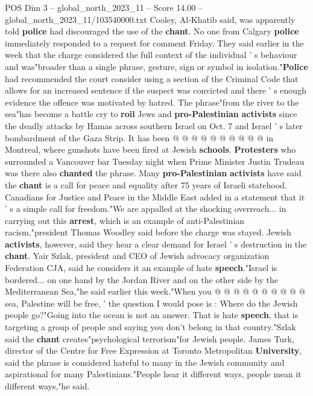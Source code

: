 \begin{textsample}{POS Dim 3 – global\_north\_2023\_11 – Score 14.00 – global\_north\_2023\_11/103540000.txt}
Cooley, Al-Khatib said, was apparently told \textbf{police} had discouraged the use of the \textbf{chant}.
No one from Calgary \textbf{police} immediately responded to a request for comment Friday.
They said earlier in the week that the charge considered the full context of the individual ' s behaviour and was"broader than a single phrase, gesture, sign or symbol in isolation."\textbf{Police} had recommended the court consider using a section of the Criminal Code that allows for an increased sentence if the suspect was convicted and there ' s enough evidence the offence was motivated by hatred.
The phrase"from the river to the sea"has become a battle cry to \textbf{roil} Jews and \textbf{pro-Palestinian} \textbf{activists} since the deadly attacks by Hamas across southern Israel on Oct. 7 and Israel ' s later bombardment of the Gaza Strip.
It has been @ @ @ @ @ @ @ @ @ @ in Montreal, where gunshots have been fired at Jewish \textbf{schools}. \textbf{Protesters} who surrounded a Vancouver bar Tuesday night when Prime Minister Justin Trudeau was there also \textbf{chanted} the phrase.
Many \textbf{pro-Palestinian} \textbf{activists} have said the \textbf{chant} is a call for peace and equality after 75 years of Israeli statehood.
Canadians for Justice and Peace in the Middle East added in a statement that it ' s a simple call for freedom."We are appalled at the shocking overreach... in carrying out this \textbf{arrest}, which is an example of anti-Palestinian racism,"president Thomas Woodley said before the charge was stayed.
Jewish \textbf{activists}, however, said they hear a clear demand for Israel ' s destruction in the \textbf{chant}.
Yair Szlak, president and CEO of Jewish advocacy organization Federation CJA, said he considers it an example of hate \textbf{speech}."Israel is bordered... on one hand by the Jordan River and on the other side by the Mediterranean Sea,"he said earlier this week."When you @ @ @ @ @ @ @ @ @ @ sea, Palestine will be free, ' the question I would pose is : Where do the Jewish people go?"Going into the ocean is not an answer.
That is hate \textbf{speech}, that is targeting a group of people and saying you don't belong in that country."Szlak said the \textbf{chant} creates"psychological terrorism"for Jewish people.
James Turk, director of the Centre for Free Expression at Toronto Metropolitan \textbf{University}, said the phrase is considered hateful to many in the Jewish community and aspirational for many Palestinians."People hear it different ways, people mean it different ways,"he said.

\end{textsample}
